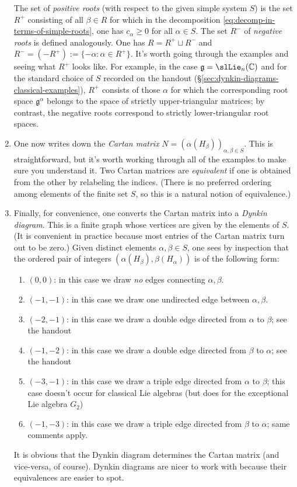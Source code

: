 \documentclass[reqno]{amsart} 
\begin{document}
\begin{enumerate}
  The set of \emph{positive roots} (with respect to the given simple system $S$) is the set $R^+$ consisting of all $\beta \in R$ for which in the decomposition \eqref{eq:decomp-in-terms-of-simple-roots}, one has $c_\alpha \geq 0$ for all $\alpha \in S$.  The set $R^-$ of \emph{negative roots} is defined analogously.  One has $R = R^+ \sqcup R^-$ and $R^- = (-R^+) := \{- \alpha : \alpha \in R^+\}$.  It's worth going through the examples and seeing what $R^+$ looks like.  For example, in the case $\mathfrak{g} = \slLie_n(\mathbb{C})$ and for the standard choice of $S$ recorded on the handout (\S\ref{sec:dynkin-diagrams-classical-examples}), $R^+$ consists of those $\alpha$ for which the corresponding root space $\mathfrak{g}^\alpha$ belongs to the space of strictly upper-triangular matrices; by contrast, the negative roots correspond to strictly lower-triangular root spaces.
\item One now writes down the \emph{Cartan matrix} $N = (\alpha(H_\beta))_{\alpha,\beta \in S}$.  This is straightforward, but it's worth working through all of the examples to make sure you understand it.  Two Cartan matrices are \emph{equivalent} if one is obtained from the other by relabeling the indices.  (There is no preferred ordering among elements of the finite set $S$, so this is a natural notion of equivalence.)
\item Finally, for convenience, one converts the Cartan matrix into a \emph{Dynkin diagram}.  This is a finite graph whose vertices are given by the elements of $S$.  (It is convenient in practice because most entries of the Cartan matrix turn out to be zero.)  Given distinct elements $\alpha, \beta \in S$, one sees by inspection that the ordered pair of integers $(\alpha(H_\beta), \beta(H_\alpha))$ is of the following form:
  \begin{enumerate}
  \item $(0,0)$: in this case we draw \emph{no} edges connecting $\alpha,\beta$.
  \item $(-1,-1)$: in this case we draw one undirected edge between $\alpha,\beta$.
  \item $(-2,-1)$: in this case we draw a double edge directed from $\alpha$ to $\beta$; see the handout
  \item $(-1,-2)$: in this case we draw a double edge directed from $\beta$ to $\alpha$; see the handout
  \item $(-3,-1)$: in this case we draw a triple edge directed from $\alpha$ to $\beta$; this case doesn't occur for classical Lie algebras (but does for the exceptional Lie algebra $G_2$)
  \item $(-1,-3)$: in this case we draw a triple edge directed from $\beta$ to $\alpha$; same comments apply.
  \end{enumerate}
  It is obvious that the Dynkin diagram determines the Cartan matrix (and vice-versa, of course).  Dynkin diagrams are nicer to work with because their equivalences are easier to spot.
\end{enumerate}
\end{document}
